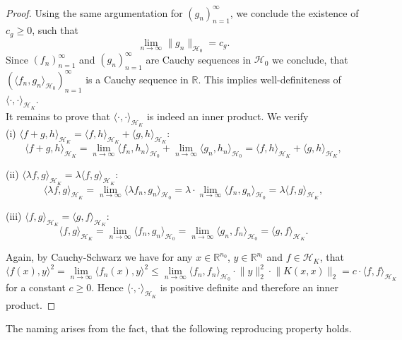 \documentclass[11pt, a4paper]{article}
\newcommand{\N}{\mathbb{N}}
\newcommand{\R}{\mathbb{R}}
\renewcommand{\H}{\mathcal{H}}
\begin{document}
\begin{proof}
Using the same argumentation for $(g_n)_{n=1}^\infty$, we conclude the existence of $c_g \geq 0$, such that 
\[ \lim_{n \to \infty} \| g_n \big \|_{\H_0} = c_g. \] 
Since $(f_n)_{n=1}^\infty$ and $(g_n)_{n=1}^\infty$ are Cauchy sequences in $\H_0$ we conclude, that $(\langle f_n, g_n \rangle_{\H_0})_{n=1}^\infty$ is a Cauchy sequence in $\R$. This implies well-definiteness of $\langle \cdot, \cdot \rangle_{\H_K}$. \\

It remains to prove that $\langle \cdot, \cdot \rangle_{\H_K}$ is indeed an inner product. We verify \\

(i) $\langle f + g , h \rangle_{\H_K} = \langle f , h \rangle_{\H_K} + \langle g , h \rangle_{\H_K}$:
\[ \langle f + g , h \rangle_{\H_K} = \lim_{n \to \infty} \langle f_n , h_n \rangle_{\H_0} + \lim_{n \to \infty} \langle g_n , h_n \rangle_{\H_0} = \langle f , h \rangle_{\H_K} + \langle g , h \rangle_{\H_K}, \]

(ii) $\langle \lambda f , g \rangle_{\H_K} = \lambda \langle f, g \rangle_{\H_K}$:
\[ \langle \lambda f , g \rangle_{\H_K} = \lim_{n \to \infty} \langle \lambda f_n, g_n \rangle_{\H_0} = \lambda \cdot \lim_{n \to \infty} \langle f_n, g_n \rangle_{\H_0} = \lambda \langle f, g \rangle_{\H_K},  \]

(iii) $\langle f , g \rangle_{\H_K} = \langle g , f \rangle_{\H_K}$:
\[ \langle f , g \rangle_{\H_K} = \lim_{n \to \infty} \langle f_n, g_n \rangle_{\H_0} = \lim_{n \to \infty} \langle g_n, f_n \rangle_{\H_0} = \langle g , f \rangle_{\H_K}. \]

Again, by Cauchy-Schwarz we have for any $x \in \R^{n_0}$, $y \in \R^{n_l}$ and $f \in \H_K$, that
\[ \big \langle f(x), y \big \rangle^2 = \lim_{n \to \infty}  \big \langle f_n(x), y \big \rangle^2 \leq \lim_{n \to \infty} \big \langle f_n , f_n \big \rangle_{\H_0} \cdot \big \| y \big \|_2^2 \cdot \big \| K(x,x) \big \|_2 = c \cdot \big \langle f , f \big \rangle_{\H_K} \]
for a constant $c \geq 0$. Hence $\langle \cdot, \cdot \rangle_{\H_K}$ is positive definite and therefore an inner product.
\end{proof}

The naming arises from the fact, that the following reproducing property holds.
\end{document}

